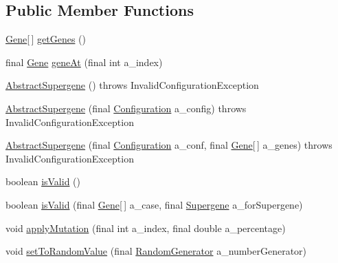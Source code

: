 \subsection*{Public Member Functions}
\begin{DoxyCompactItemize}
\item 
\hyperlink{interfaceorg_1_1jgap_1_1_gene}{Gene}\mbox{[}$\,$\mbox{]} \hyperlink{classorg_1_1jgap_1_1supergenes_1_1_abstract_supergene_a5b03d0c4d103975b296d280371b901bd}{get\-Genes} ()
\item 
final \hyperlink{interfaceorg_1_1jgap_1_1_gene}{Gene} \hyperlink{classorg_1_1jgap_1_1supergenes_1_1_abstract_supergene_a099bf664561a1f88b9826e25d870ad7f}{gene\-At} (final int a\-\_\-index)
\item 
\hyperlink{classorg_1_1jgap_1_1supergenes_1_1_abstract_supergene_aa67d2e35432f0534c38260e0b3e4d014}{Abstract\-Supergene} ()  throws Invalid\-Configuration\-Exception 
\item 
\hyperlink{classorg_1_1jgap_1_1supergenes_1_1_abstract_supergene_a8ede7cc1a661a1fb8a7d7000ec7ea11f}{Abstract\-Supergene} (final \hyperlink{classorg_1_1jgap_1_1_configuration}{Configuration} a\-\_\-config)  throws Invalid\-Configuration\-Exception 
\item 
\hyperlink{classorg_1_1jgap_1_1supergenes_1_1_abstract_supergene_a1cbbfd45d7cad277949c8571fa067013}{Abstract\-Supergene} (final \hyperlink{classorg_1_1jgap_1_1_configuration}{Configuration} a\-\_\-conf, final \hyperlink{interfaceorg_1_1jgap_1_1_gene}{Gene}\mbox{[}$\,$\mbox{]} a\-\_\-genes)  throws Invalid\-Configuration\-Exception 
\item 
boolean \hyperlink{classorg_1_1jgap_1_1supergenes_1_1_abstract_supergene_adfa0b1f704e28e3a90d187df2cf4b8b5}{is\-Valid} ()
\item 
boolean \hyperlink{classorg_1_1jgap_1_1supergenes_1_1_abstract_supergene_a4d07a7aa9a0af1e4e1a96b1a7663afee}{is\-Valid} (final \hyperlink{interfaceorg_1_1jgap_1_1_gene}{Gene}\mbox{[}$\,$\mbox{]} a\-\_\-case, final \hyperlink{interfaceorg_1_1jgap_1_1supergenes_1_1_supergene}{Supergene} a\-\_\-for\-Supergene)
\item 
void \hyperlink{classorg_1_1jgap_1_1supergenes_1_1_abstract_supergene_a008b2ecc6f66090965919b537fb327b3}{apply\-Mutation} (final int a\-\_\-index, final double a\-\_\-percentage)
\item 
void \hyperlink{classorg_1_1jgap_1_1supergenes_1_1_abstract_supergene_a92df9df781b9ae3bc7811bf76bb7ea87}{set\-To\-Random\-Value} (final \hyperlink{interfaceorg_1_1jgap_1_1_random_generator}{Random\-Generator} a\-\_\-number\-Generator)

\end{DoxyCompactItemize}
